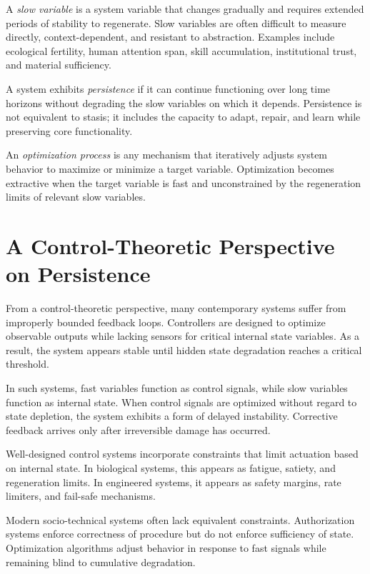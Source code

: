 \documentclass[12pt]{article} \usepackage[margin=1in]{geometry} \usepackage{setspace} \usepackage{amsmath,amssymb} \usepackage{hyperref}
\begin{document}
A \emph{slow variable} is a system variable that changes gradually and requires extended periods of stability to regenerate. Slow variables are often difficult to measure directly, context-dependent, and resistant to abstraction. Examples include ecological fertility, human attention span, skill accumulation, institutional trust, and material sufficiency.

A system exhibits \emph{persistence} if it can continue functioning over long time horizons without degrading the slow variables on which it depends. Persistence is not equivalent to stasis; it includes the capacity to adapt, repair, and learn while preserving core functionality.

An \emph{optimization process} is any mechanism that iteratively adjusts system behavior to maximize or minimize a target variable. Optimization becomes extractive when the target variable is fast and unconstrained by the regeneration limits of relevant slow variables.

\section{A Control-Theoretic Perspective on Persistence}

From a control-theoretic perspective, many contemporary systems suffer from improperly bounded feedback loops. Controllers are designed to optimize observable outputs while lacking sensors for critical internal state variables. As a result, the system appears stable until hidden state degradation reaches a critical threshold.

In such systems, fast variables function as control signals, while slow variables function as internal state. When control signals are optimized without regard to state depletion, the system exhibits a form of delayed instability. Corrective feedback arrives only after irreversible damage has occurred.

Well-designed control systems incorporate constraints that limit actuation based on internal state. In biological systems, this appears as fatigue, satiety, and regeneration limits. In engineered systems, it appears as safety margins, rate limiters, and fail-safe mechanisms.

Modern socio-technical systems often lack equivalent constraints. Authorization systems enforce correctness of procedure but do not enforce sufficiency of state. Optimization algorithms adjust behavior in response to fast signals while remaining blind to cumulative degradation.
\end{document}
